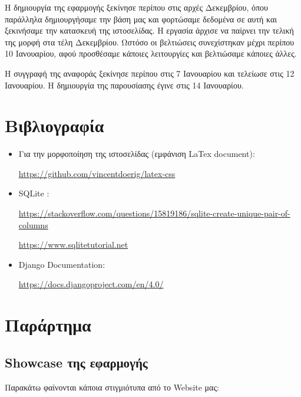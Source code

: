 \documentclass[manuscript,screen,review]{acmart}
\newcommand{\en}[1]{\foreignlanguage{english}{#1}}
\begin{document}
Η δημιουργία της εφαρμογής ξεκίνησε περίπου στις αρχές Δεκεμβρίου, όπου παράλληλα δημιουργήσαμε την βάση μας και φορτώσαμε δεδομένα σε αυτή και ξεκινήσαμε την κατασκευή της ιστοσελίδας.
Η εργασία άρχισε να παίρνει την τελική της μορφή στα τέλη Δεκεμβρίου. Ωστόσο οι βελτιώσεις συνεχίστηκαν μέχρι περίπου 10 Ιανουαρίου, αφού προσθέσαμε κάποιες λειτουργίες και βελτιώσαμε κάποιες άλλες.

Η συγγραφή της αναφοράς ξεκίνησε περίπου στις 7 Ιανουαρίου και τελείωσε στις 12 Ιανουαρίου. H δημιουργία της παρουσίασης έγινε στις 14 Ιανουαρίου.




\section{Βιβλιογραφία}
\begin{itemize}
    \item Για την μορφοποίηση της ιστοσελίδας (εμφάνιση \en{LaTex document}): 
    
    \en{\url{https://github.com/vincentdoerig/latex-css}}
    \item \en{SQLite }:
    
    \en{\url{https://stackoverflow.com/questions/15819186/sqlite-create-unique-pair-of-columns}}
    
    \en{\url{ https://www.sqlitetutorial.net}}
    
    \item \en{Django Documentation}:
    
    \en{\url{https://docs.djangoproject.com/en/4.0/}}
\end{itemize}



\section{Παράρτημα}


\subsection{\en{Showcase} της εφαρμογής}
Παρακάτω φαίνονται κάποια στιγμιότυπα από το \en{Website} μας:
\end{document}
